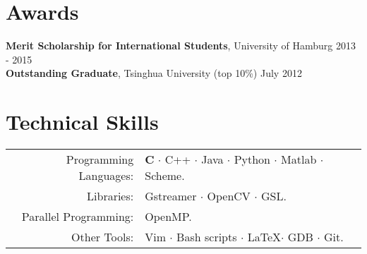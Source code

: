 \documentclass[a4paper,11pt]{article} %
\begin{document}

\section{Awards}

\textbf{Merit Scholarship for International Students}, University of Hamburg \hfill 2013 - 2015 \\
\textbf{Outstanding Graduate}, Tsinghua University (top 10\%) \hfill July 2012


\section{Technical Skills}

\begin{tabular}{rl}
  Programming Languages: & \textbf{C} $\cdotp$ C++ $\cdotp$ Java $\cdotp$ Python $\cdotp$ Matlab $\cdotp$ Scheme. \\
  Libraries: & Gstreamer $\cdotp$ OpenCV $\cdotp$ GSL. \\
  Parallel Programming: & OpenMP. \\
  Other Tools: & Vim $\cdotp$ Bash scripts $\cdotp$ \LaTeX $\cdotp$ GDB $\cdotp$ Git. \\
\end{tabular}

\end{document}
